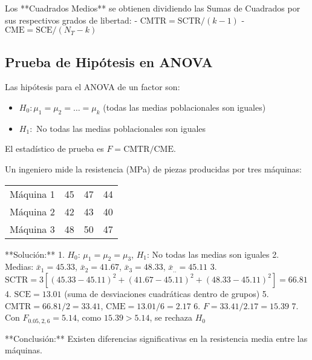Los **Cuadrados Medios** se obtienen dividiendo las Sumas de Cuadrados por sus respectivos grados de libertad:
- $\text{CMTR} = \text{SCTR}/(k-1)$
- $\text{CME} = \text{SCE}/(N_T-k)$

\subsection{Prueba de Hipótesis en ANOVA}

\begin{theorem}
Las hipótesis para el ANOVA de un factor son:
\begin{itemize}
    \item $H_0: \mu_1 = \mu_2 = \ldots = \mu_k$ (todas las medias poblacionales son iguales)
    \item $H_1:$ No todas las medias poblacionales son iguales
\end{itemize}
El estadístico de prueba es $F = \text{CMTR}/\text{CME}$.
\end{theorem}

\begin{example}
Un ingeniero mide la resistencia (MPa) de piezas producidas por tres máquinas:

\begin{center}
\begin{tabular}{lccc}
Máquina 1 & 45 & 47 & 44 \\
Máquina 2 & 42 & 43 & 40 \\
Máquina 3 & 48 & 50 & 47 \\
\end{tabular}
\end{center}

**Solución:**
1. $H_0$: $\mu_1 = \mu_2 = \mu_3$, $H_1$: No todas las medias son iguales
2. Medias: $\bar{x}_1 = 45.33$, $\bar{x}_2 = 41.67$, $\bar{x}_3 = 48.33$, $\bar{x}_{..} = 45.11$
3. $\text{SCTR} = 3[(45.33-45.11)^2 + (41.67-45.11)^2 + (48.33-45.11)^2] = 66.81$
4. $\text{SCE} = 13.01$ (suma de desviaciones cuadráticas dentro de grupos)
5. $\text{CMTR} = 66.81/2 = 33.41$, $\text{CME} = 13.01/6 = 2.17$
6. $F = 33.41/2.17 = 15.39$
7. Con $F_{0.05,2,6} = 5.14$, como $15.39 > 5.14$, se rechaza $H_0$

**Conclusión:** Existen diferencias significativas en la resistencia media entre las máquinas.
\end{example}

